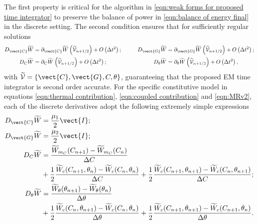 {{\begin{itemize}
\end{itemize}


The first property is critical for the algorithm in \eqref{eqn:weak forms for proposed time integrator} to preserve the balance of power in \eqref{eqn:balance of energy final} in the discrete setting. 
The second condition ensures that for sufficiently regular solutions 
%
\begin{equation}\label{eqn:Taylor}
\begin{aligned}
D_{\vect{C}}\widetilde{W}& = \partial_{\vect{C}}\widetilde{W}\left(\widetilde{\mathcal{V}}_{n+1/2}\right) + O\left(\Delta t^2\right);&\qquad
%
D_{\vect{G}}\widetilde{W}& = \partial_{\vect{G}}\widetilde{W}\left(\widetilde{\mathcal{V}}_{n+1/2}\right) + O\left(\Delta t^2\right);\\
%
D_{{C}}\widetilde{W}& = \partial_{{C}}\widetilde{W}\left(\widetilde{\mathcal{V}}_{n+1/2}\right) + O\left(\Delta t^2\right);&\qquad
%
D_{\theta}\widetilde{W}& = \partial_{\theta}\widetilde{W}\left(\widetilde{\mathcal{V}}_{n+1/2}\right) + O\left(\Delta t^2\right),
\end{aligned}
\end{equation}
%
with $\widetilde{\mathcal{V}} = \{\vect{C},\vect{G},C,\theta\}$, guaranteeing that the proposed EM time integrator is second order accurate.  
For the specific constitutive model in equations  \eqref{eqn:thermal contribution}, \eqref{eqn:coupled contribution} and \eqref{eqn:MRv2}, each of the discrete derivatives adopt the following extremely simple expressions
%
\begin{equation}\label{eqn:MR discrete derivatives}
\begin{aligned}
D_{\vect{C}}\widetilde{W}&= \frac{\mu_1}{2}\vect{I};\\ 
D_{\vect{G}}\widetilde{W}&= \frac{\mu_2}{2}\vect{I};\\
D_{C}\widetilde{W}& = \frac{\widetilde{W}_{m_C}(C_{n+1})-\widetilde{W}_{m_C}(C_{n})}{\Delta C}\\&+ \frac{1}{2}\frac{\widetilde{W}_c(C_{n+1},\theta_n)-\widetilde{W}_c(C_{n},\theta_n)}{\Delta C} + \frac{1}{2}\frac{\widetilde{W}_c(C_{n+1},\theta_{n+1})-\widetilde{W}_c(C_{n},\theta_{n+1})}{\Delta C};\\
%
D_{\theta}\widetilde{W}& = \frac{\widetilde{W}_{\theta}(\theta_{n+1})-\widetilde{W}_{\theta}(\theta_{n})}{\Delta \theta}\\&+ \frac{1}{2}\frac{\widetilde{W}_c(C_{n},\theta_{n+1})-\widetilde{W}_c(C_{n},\theta_n)}{\Delta \theta} + \frac{1}{2}\frac{\widetilde{W}_c(C_{n+1},\theta_{n+1})-\widetilde{W}_c(C_{n+1},\theta_{n})}{\Delta \theta}.
%
\end{aligned}
\end{equation}

}}
